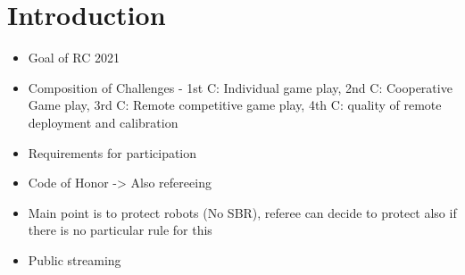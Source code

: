\section{Introduction}

\begin{itemize}
    \item Goal of RC 2021
    \item Composition of Challenges - 1st C: Individual game play, 2nd C: Cooperative Game play, 3rd C: Remote competitive game play, 4th C: quality of remote deployment and calibration 
    \item Requirements for participation
    \item Code of Honor -> Also refereeing
    \item Main point is to protect robots (No SBR), referee can decide to protect also if there is no particular rule for this
    \item Public streaming
\end{itemize}